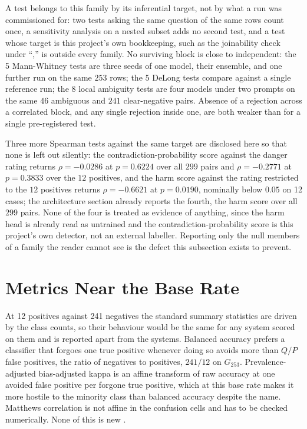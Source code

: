 A test belongs to this family by its inferential target, not by what a run was commissioned for:
two tests asking the same question of the same rows count once, a sensitivity analysis on a nested
subset adds no second test, and a test whose target is this project's own bookkeeping, such as the
joinability check under ``,'' is outside every family. No surviving block
is close to independent: the 5 Mann-Whitney tests are three seeds of one model, their ensemble, and
one further run on the same $253$ rows; the 5 DeLong tests compare against a single reference run;
the 8 local ambiguity tests are four models under two prompts on the same $46$ ambiguous and $241$
clear-negative pairs. Absence of a rejection across a correlated block, and any single rejection
inside one, are both weaker than for a single pre-registered test.

Three more Spearman tests against the same target are disclosed here so
that none is left out silently: the contradiction-probability score against the
danger rating returns $\rho = -0.0286$ at $p = 0.6224$ over all $299$ pairs
and $\rho = -0.2771$ at $p = 0.3833$ over the $12$ positives, and the harm
score against the rating restricted to the $12$ positives returns
$\rho = -0.6621$ at $p = 0.0190$, nominally below $0.05$ on 12 cases;
the architecture section already reports the fourth, the harm score over all
$299$ pairs. None of the four is treated as evidence of anything, since the
harm head is already read as untrained and the contradiction-probability
score is this project's own detector, not an external labeller.
Reporting only the null members of a family the reader cannot see is the
defect this subsection exists to prevent.

\section{Metrics Near the Base Rate}
\label{sec:res-metrics}

At 12 positives against 241 negatives the standard summary statistics are driven by the class
counts, so their behaviour would be the same for any system scored on them and is reported
apart from the systems. Balanced accuracy \citep{brodersen2010balanced} prefers a classifier
that forgoes one true positive whenever doing so avoids more than $Q/P$ false positives, the
ratio of negatives to positives, $241/12$ on $G_{253}$. Prevalence-adjusted bias-adjusted kappa
\citep{byrt1993pabak} is an affine transform of raw accuracy at one avoided false positive per
forgone true positive, which at this base rate makes it more hostile to the minority class than
balanced accuracy despite the name. Matthews correlation \citep{matthews1975mcc} is not affine
in the confusion cells and has to be checked numerically. None of this is new
\citep{feinstein1990paradoxes,cicchetti1990resolving,delgado2019kappa}.

